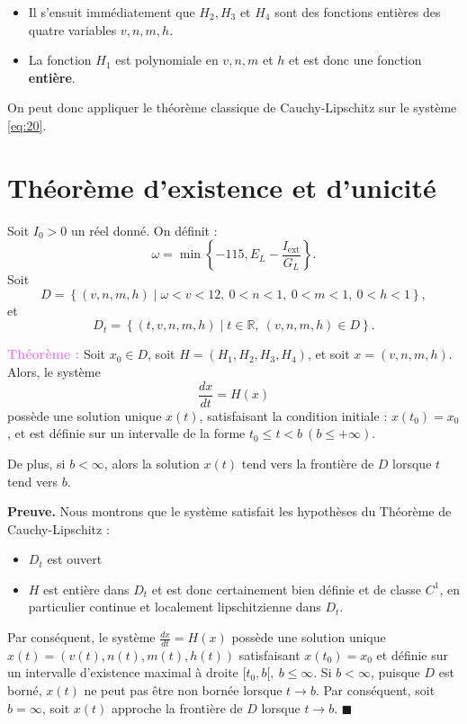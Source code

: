 	\begin{itemize}
		\item[$\to$] Il s'ensuit immédiatement que $H_2, H_3$ et $H_4$ 
		sont des fonctions entières des quatre variables $v, n, m, h$.
		\item La fonction $H_1$ est polynomiale en $v, n, m$ et $h$ et est donc une fonction \textbf{entière}.
	\end{itemize}
	On peut donc appliquer le théorème classique de Cauchy-Lipschitz sur le système \eqref{eq:20}.
	
\section{Théorème d'existence et d'unicité}
	\begin{theorem}
	Soit $I_0 > 0$ un réel donné. On définit :
	\[
	\omega = \min \left\{ -115, E_L -\frac{I_{\text{ext}}}{G_L} \right\}.
	\]
	Soit
	\[
	D = \left\{ (v, n, m, h) \mid \omega < v < 12, \ 0 < n < 1, \ 0 < m < 1, \ 0 < h < 1 \right\},
	\]
	et 
	\[
	D_t = \left\{ (t, v, n, m, h) \mid t \in \mathbb{R}, \ (v, n, m, h) \in D \right\}.
	\]


		\textbf{\textcolor{violet}{Théorème :}}
		Soit $x_0 \in D$, soit $H=(H_1, H_2, H_3,H_4)$, et soit $x=(v,n,m,h)$. 
		Alors, le système
		\[
		\frac{dx}{dt}=H(x)
		\]
		possède une solution unique $x(t)$, satisfaisant la condition initiale : $x(t_0) = x_0$, et est définie sur un intervalle de la forme $t_0 \leq t < b 
		~(b \leq +\infty)$.
		
		De plus, si $b < \infty$, alors la solution $x(t)$ tend vers la frontière de $D$ lorsque $t$ tend vers $b$.
	\end{theorem}

	\textbf{Preuve.} Nous montrons que le système satisfait les hypothèses du Théorème de Cauchy-Lipschitz :
	\begin{itemize}
		\item $D_t$ est ouvert
		\item $H$ est entière dans $D_t$ et est donc certainement bien définie et de classe $C^1$, en particulier continue et localement lipschitzienne dans $D_t$.
	\end{itemize}
	
	Par conséquent, le système $\frac{dx}{dt} = H(x)$ possède une solution unique $x(t) = (v(t), n(t), m(t), h(t))$ satisfaisant $x(t_0) = x_0$ et définie sur un intervalle d'existence maximal à droite $[t_0, b[,~ b \leq \infty$. Si $b < \infty$, puisque $D$ est borné, $x(t)$ ne peut pas être non bornée lorsque $t \to b$. Par conséquent, soit $b = \infty$, soit $x(t)$ approche la frontière de $D$ lorsque $t \to b$. $\blacksquare$

